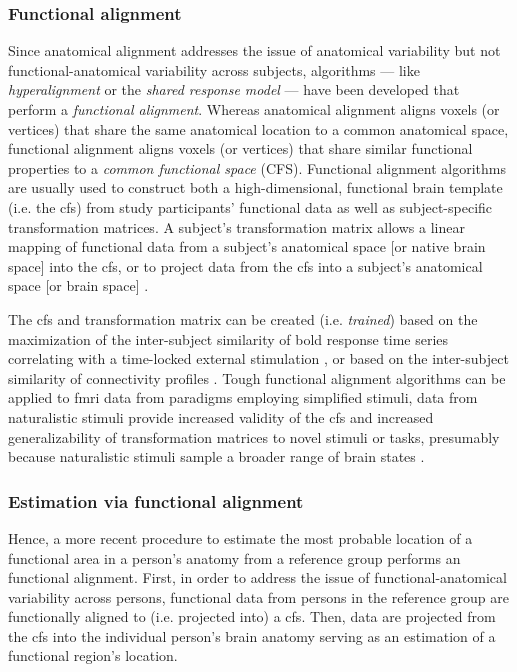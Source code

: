 \subsubsection{Functional alignment}


%
Since anatomical alignment addresses the issue of anatomical variability but not
functional-anatomical variability across subjects, algorithms --- like
\textit{hyperalignment} \citep{haxby2011common, guntupalli2016model} or the
\textit{shared response model} \citep{chen2015reduced, zhang2016searchlight} ---
have been developed that perform a \textit{functional alignment}.
%
Whereas anatomical alignment aligns voxels (or vertices) that share the same
anatomical location to a common anatomical space, functional alignment aligns
voxels (or vertices) that share similar functional properties to a
\textit{common functional space} (CFS).
%
Functional alignment algorithms are usually used to construct both a
high-dimensional, functional brain template (i.e. the \ac{cfs}) from study
participants' functional data as well as subject-specific transformation
matrices.
%
A subject's transformation matrix allows a linear mapping of functional data
from a subject's anatomical space [or native brain space] into the \ac{cfs}, or
to project data from the \ac{cfs} into a subject's anatomical space [or brain
space] \citep{haxby2020hyperalignment}.

%
The \ac{cfs} and transformation matrix can be created (i.e.  \textit{trained})
based on the maximization of the inter-subject similarity of \ac{bold} response
time series correlating with a time-locked external stimulation
\citep{haxby2011common, chen2015reduced, sabuncu2010function}, or based on the
inter-subject similarity of connectivity profiles \citep{feilong2018reliable,
guntupalli2018computational, nastase2019leveraging}.
%
Tough functional alignment algorithms can be applied to \ac{fmri} data from
paradigms employing simplified stimuli, data from naturalistic stimuli provide
increased validity of the \ac{cfs} and increased generalizability of
transformation matrices to novel stimuli or tasks, presumably because
naturalistic stimuli sample a broader range of brain states
\citep{haxby2011common, guntupalli2016model}.


\subsubsection{Estimation via functional alignment}
%
Hence, a more recent procedure \citep[e.g., ][]{jiahui2020predicting,
guntupalli2016model, haxby2011common} to estimate the most probable location of
a functional area in a person's anatomy from a reference group performs an
functional alignment.
First, in order to address the issue of functional-anatomical variability across
persons, functional data from persons in the reference group are functionally
aligned to (i.e. projected into) a \ac{cfs}.
%
Then, data are projected from the \ac{cfs} into the individual person's brain
anatomy serving as an estimation of a functional region's location.

